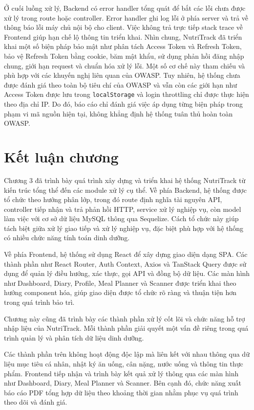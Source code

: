 \documentclass[12pt, a4paper]{report}
\begin{document}
Ở cuối luồng xử lý, Backend có error handler tổng quát để bắt các lỗi chưa được xử lý trong route hoặc controller. Error handler ghi log lỗi ở phía server và trả về thông báo lỗi máy chủ nội bộ cho client. Việc không trả trực tiếp stack trace về Frontend giúp hạn chế lộ thông tin triển khai. Nhìn chung, NutriTrack đã triển khai một số biện pháp bảo mật như phân tách Access Token và Refresh Token, bảo vệ Refresh Token bằng cookie, băm mật khẩu, sử dụng phản hồi đăng nhập chung, giới hạn request và chuẩn hóa xử lý lỗi. Một số cơ chế này tham chiếu và phù hợp với các khuyến nghị liên quan của OWASP. Tuy nhiên, hệ thống chưa được đánh giá theo toàn bộ tiêu chí của OWASP và vẫn còn các giới hạn như Access Token được lưu trong \texttt{localStorage} và login throttling chỉ được thực hiện theo địa chỉ IP. Do đó, báo cáo chỉ đánh giá việc áp dụng từng biện pháp trong phạm vi mã nguồn hiện tại, không khẳng định hệ thống tuân thủ hoàn toàn OWASP.

\section{Kết luận chương}Chương 3 đã trình bày quá trình xây dựng và triển khai hệ thống NutriTrack từ kiến trúc tổng thể đến các module xử lý cụ thể. Về phía Backend, hệ thống được tổ chức theo hướng phân lớp, trong đó route định nghĩa tài nguyên API, controller tiếp nhận và trả phản hồi HTTP, service xử lý nghiệp vụ, còn model làm việc với cơ sở dữ liệu MySQL thông qua Sequelize. Cách tổ chức này giúp tách biệt giữa xử lý giao tiếp và xử lý nghiệp vụ, đặc biệt phù hợp với hệ thống có nhiều chức năng tính toán dinh dưỡng.

Về phía Frontend, hệ thống sử dụng React để xây dựng giao diện dạng SPA. Các thành phần như React Router, Auth Context, Axios và TanStack Query được sử dụng để quản lý điều hướng, xác thực, gọi API và đồng bộ dữ liệu. Các màn hình như Dashboard, Diary, Profile, Meal Planner và Scanner được triển khai theo hướng component hóa, giúp giao diện được tổ chức rõ ràng và thuận tiện hơn trong quá trình bảo trì.

Chương này cũng đã trình bày các thành phần xử lý cốt lõi và chức năng hỗ trợ nhập liệu của NutriTrack. Mỗi thành phần giải quyết một vấn đề riêng trong quá trình quản lý và phân tích dữ liệu dinh dưỡng.


Các thành phần trên không hoạt động độc lập mà liên kết với nhau thông qua dữ liệu mục tiêu cá nhân, nhật ký ăn uống, cân nặng, nước uống và thông tin thực phẩm. Frontend tiếp nhận và trình bày kết quả xử lý thông qua các màn hình như Dashboard, Diary, Meal Planner và Scanner. Bên cạnh đó, chức năng xuất báo cáo PDF tổng hợp dữ liệu theo khoảng thời gian nhằm phục vụ quá trình theo dõi và đánh giá.
\end{document}
